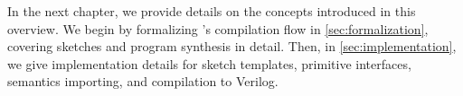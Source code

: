 In the next chapter,
  we provide details on the concepts introduced in this overview.
We begin by formalizing \lr's compilation flow in \cref{sec:formalization}, 
  covering sketches and program synthesis in detail.
Then, in \cref{sec:implementation}, we give implementation details for sketch templates, primitive interfaces, semantics importing, and compilation to Verilog.
  

